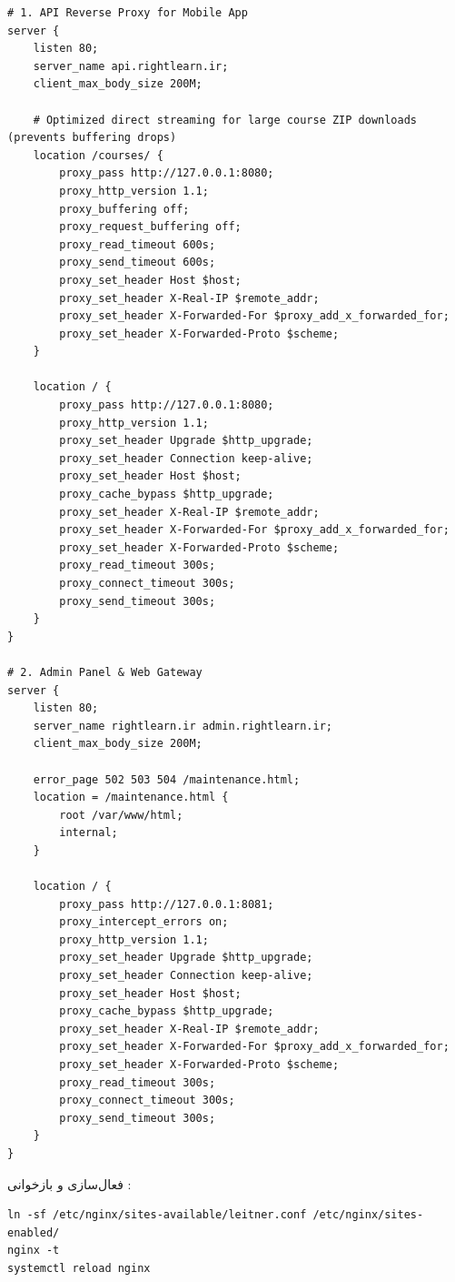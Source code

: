 \documentclass[11pt,a4paper]{article}
\begin{document}
\begin{latin}
\footnotesize
\begin{verbatim}
# 1. API Reverse Proxy for Mobile App
server {
    listen 80;
    server_name api.rightlearn.ir;
    client_max_body_size 200M;

    # Optimized direct streaming for large course ZIP downloads (prevents buffering drops)
    location /courses/ {
        proxy_pass http://127.0.0.1:8080;
        proxy_http_version 1.1;
        proxy_buffering off;
        proxy_request_buffering off;
        proxy_read_timeout 600s;
        proxy_send_timeout 600s;
        proxy_set_header Host $host;
        proxy_set_header X-Real-IP $remote_addr;
        proxy_set_header X-Forwarded-For $proxy_add_x_forwarded_for;
        proxy_set_header X-Forwarded-Proto $scheme;
    }

    location / {
        proxy_pass http://127.0.0.1:8080;
        proxy_http_version 1.1;
        proxy_set_header Upgrade $http_upgrade;
        proxy_set_header Connection keep-alive;
        proxy_set_header Host $host;
        proxy_cache_bypass $http_upgrade;
        proxy_set_header X-Real-IP $remote_addr;
        proxy_set_header X-Forwarded-For $proxy_add_x_forwarded_for;
        proxy_set_header X-Forwarded-Proto $scheme;
        proxy_read_timeout 300s;
        proxy_connect_timeout 300s;
        proxy_send_timeout 300s;
    }
}

# 2. Admin Panel & Web Gateway
server {
    listen 80;
    server_name rightlearn.ir admin.rightlearn.ir;
    client_max_body_size 200M;

    error_page 502 503 504 /maintenance.html;
    location = /maintenance.html {
        root /var/www/html;
        internal;
    }

    location / {
        proxy_pass http://127.0.0.1:8081;
        proxy_intercept_errors on;
        proxy_http_version 1.1;
        proxy_set_header Upgrade $http_upgrade;
        proxy_set_header Connection keep-alive;
        proxy_set_header Host $host;
        proxy_cache_bypass $http_upgrade;
        proxy_set_header X-Real-IP $remote_addr;
        proxy_set_header X-Forwarded-For $proxy_add_x_forwarded_for;
        proxy_set_header X-Forwarded-Proto $scheme;
        proxy_read_timeout 300s;
        proxy_connect_timeout 300s;
        proxy_send_timeout 300s;
    }
}
\end{verbatim}
\end{latin}

فعال‌سازی و بازخوانی :
\begin{latin}
\small
\begin{verbatim}
ln -sf /etc/nginx/sites-available/leitner.conf /etc/nginx/sites-enabled/
nginx -t
systemctl reload nginx
\end{verbatim}
\end{latin}
\end{document}
